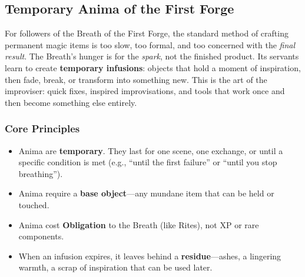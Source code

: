 
\subsection{Temporary Anima of the First Forge}
\label{subsec:first-forge-infusions}

For followers of the Breath of the First Forge, the standard method of crafting permanent magic items is too slow, too formal, and too concerned with the \emph{final result}. The Breath's hunger is for the \emph{spark}, not the finished product. Its servants learn to create \textbf{temporary infusions}: objects that hold a moment of inspiration, then fade, break, or transform into something new. This is the art of the improviser: quick fixes, inspired improvisations, and tools that work once and then become something else entirely.

\subsubsection*{Core Principles}
\begin{itemize}
  \item Anima are \textbf{temporary}. They last for one scene, one exchange, or until a specific condition is met (e.g., ``until the first failure'' or ``until you stop breathing'').
  \item Anima require a \textbf{base object}---any mundane item that can be held or touched.
  \item Anima cost \textbf{Obligation} to the Breath (like Rites), not XP or rare components.
  \item When an infusion expires, it leaves behind a \textbf{residue}---ashes, a lingering warmth, a scrap of inspiration that can be used later.
\end{itemize}

